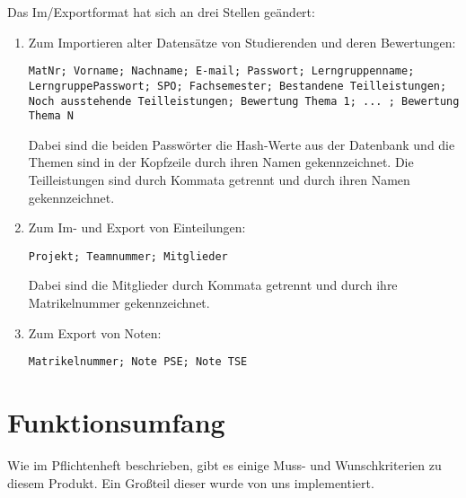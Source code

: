\documentclass[parskip=full]{scrartcl}
\begin{document}
Das Im/Exportformat hat sich an drei Stellen geändert: 
\begin{enumerate}
  \item Zum Importieren alter Datensätze von Studierenden und deren Bewertungen:
 \\ \begin{tcolorbox}[enhanced jigsaw, %
 colback=testgrauRGB, %
 coltext=black, %
 sharp corners, %
 colframe=black, %
 boxrule=0pt %
 ]
 \texttt{MatNr; Vorname; Nachname; E-mail; Passwort; Lerngruppenname;
 LerngruppePasswort; SPO; Fachsemester; Bestandene Teilleistungen; Noch
 ausstehende Teilleistungen; Bewertung Thema 1; ... ; Bewertung Thema N}
  \end{tcolorbox}
  Dabei sind die beiden Passwörter die Hash-Werte aus der Datenbank und die
  Themen sind in der Kopfzeile durch ihren Namen gekennzeichnet. Die
  Teilleistungen sind durch Kommata getrennt und durch ihren Namen
  gekennzeichnet. 
  \item Zum Im- und Export von Einteilungen: \\ \begin{tcolorbox}[enhanced
  jigsaw,
 colback=testgrauRGB, %
 coltext=black, %
 sharp corners, %
 colframe=black, %
 boxrule=0pt %
 ]
 \texttt{Projekt; Teamnummer; Mitglieder}
  \end{tcolorbox}
  Dabei sind die Mitglieder durch Kommata getrennt und durch ihre Matrikelnummer
  gekennzeichnet.
  \item Zum Export von Noten: \\ \begin{tcolorbox}[enhanced
  jigsaw,
 colback=testgrauRGB, %
 coltext=black, %
 sharp corners, %
 colframe=black, %
 boxrule=0pt %
 ]
 \texttt{Matrikelnummer; Note PSE; Note TSE}
  \end{tcolorbox}
\end{enumerate}

\section{Funktionsumfang}
Wie im Pflichtenheft beschrieben, gibt es einige Muss- und Wunschkriterien zu
diesem Produkt. Ein Großteil dieser wurde von uns implementiert.
\end{document}
